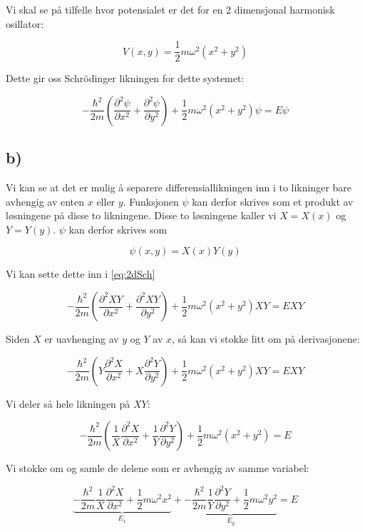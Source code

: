 \documentclass[a4paper,norsk, 10pt]{article}
\numberwithin{equation}{section}
\begin{document}
Vi skal se på tilfelle hvor potensialet er det for en 2 dimensjonal harmonisk osillator:

$$
V(x,y) = \frac{1}{2}m\omega^2(x^2 + y^2)
$$

Dette gir oss Schrödinger likningen for dette systemet:

\begin{equation}
-\frac{\hbar^2}{2m}\left(\frac{\partial^2 \psi}{\partial x^2} + \frac{\partial^2 \psi}{\partial y^2}\right) + \frac{1}{2}m\omega^2(x^2 + y^2)\psi = E\psi
\label{eq:2dSch}
\end{equation}

\subsection*{b)}

Vi kan se at det er mulig å separere differensiallikningen inn i to likninger bare avhengig av enten $x$ eller $y$. Funksjonen $\psi$ kan derfor skrives som et produkt av løsningene på disse to likningene. Disse to løsningene kaller vi $X = X(x)$ og $Y = Y(y)$. $\psi$ kan derfor skrives som

$$
\psi(x,y) = X(x)Y(y)
$$

Vi kan sette dette inn i \ref{eq:2dSch}

$$
-\frac{\hbar^2}{2m}\left(\frac{\partial^2 XY}{\partial x^2} + \frac{\partial^2 XY}{\partial y^2}\right) + \frac{1}{2}m\omega^2(x^2 + y^2)XY = EXY
$$


Siden $X$ er uavhenging av $y$ og $Y$ av $x$, så kan vi stokke litt om på derivasjonene:

$$
-\frac{\hbar^2}{2m}\left(Y\frac{\partial^2 X}{\partial x^2} + X\frac{\partial^2 Y}{\partial y^2}\right) + \frac{1}{2}m\omega^2(x^2 + y^2)XY = EXY
$$

Vi deler så hele likningen på $XY$:

$$
-\frac{\hbar^2}{2m}\left(\frac{1}{X}\frac{\partial^2 X}{\partial x^2} + \frac{1}{Y}\frac{\partial^2 Y}{\partial y^2}\right) + \frac{1}{2}m\omega^2(x^2 + y^2) = E
$$

Vi stokke om og samle de delene som er avhengig av samme variabel:

\begin{equation}
\underbrace{-\frac{\hbar^2}{2m}\frac{1}{X}\frac{\partial^2 X}{\partial x^2} + \frac{1}{2}m\omega^2x^2}_{E_x} + \underbrace{-\frac{\hbar^2}{2m}\frac{1}{Y}\frac{\partial^2 Y}{\partial y^2} + \frac{1}{2}m\omega^2y^2}_{E_y} = E
\label{eq:ExEy}
\end{equation}
\end{document}
